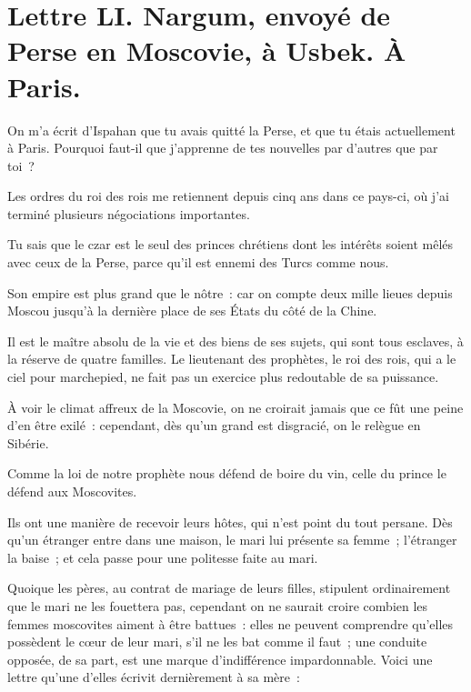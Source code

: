 \documentclass[french,twoside]{book} %
\begin{document}
\section[{Lettre LI. Nargum, envoyé de Perse en Moscovie, à Usbek. À Paris.}]{Lettre LI. Nargum, envoyé de Perse en Moscovie, à Usbek. À Paris.}\renewcommand{\leftmark}{Lettre LI. Nargum, envoyé de Perse en Moscovie, à Usbek. À Paris.}

\noindent On m’a écrit d’Ispahan que tu avais quitté la Perse, et que tu étais actuellement à Paris. Pourquoi faut-il que j’apprenne de tes nouvelles par d’autres que par toi ?\par
Les ordres du roi des rois me retiennent depuis cinq ans dans ce pays-ci, où j’ai terminé plusieurs négociations importantes.\par
Tu sais que le czar est le seul des princes chrétiens dont les intérêts soient mêlés avec ceux de la Perse, parce qu’il est ennemi des Turcs comme nous.\par
Son empire est plus grand que le nôtre : car on compte deux mille lieues depuis Moscou jusqu’à la dernière place de ses États du côté de la Chine.\par
Il est le maître absolu de la vie et des biens de ses sujets, qui sont tous esclaves, à la réserve de quatre familles. Le lieutenant des prophètes, le roi des rois, qui a le ciel pour marchepied, ne fait pas un exercice plus redoutable de sa puissance.\par
À voir le climat affreux de la Moscovie, on ne croirait jamais que ce fût une peine d’en être exilé : cependant, dès qu’un grand est disgracié, on le relègue en Sibérie.\par
Comme la loi de notre prophète nous défend de boire du vin, celle du prince le défend aux Moscovites.\par
Ils ont une manière de recevoir leurs hôtes, qui n’est point du tout persane. Dès qu’un étranger entre dans une maison, le mari lui présente sa femme ; l’étranger la baise ; et cela passe pour une politesse faite au mari.\par
Quoique les pères, au contrat de mariage de leurs filles, stipulent ordinairement que le mari ne les fouettera pas, cependant on ne saurait croire combien les femmes moscovites aiment à être battues : elles ne peuvent comprendre qu’elles possèdent le cœur de leur mari, s’il ne les bat comme il faut ; une conduite opposée, de sa part, est une marque d’indifférence impardonnable. Voici une lettre qu’une d’elles écrivit dernièrement à sa mère :\par
\end{document}
